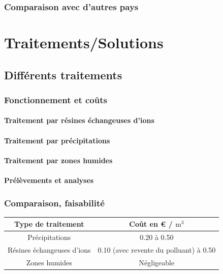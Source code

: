 \documentclass{article}
\begin{document}
\subsubsection{Comparaison avec d’autres pays }

\newpage
\section{Traitements/Solutions}
\subsection{Différents traitements}
\subsubsection{Fonctionnement et coûts}
\paragraph{Traitement par résines échangeuses d’ions} 
\paragraph{Traitement par précipitations}
\paragraph{Traitement par zones humides}
\paragraph{Prélèvements et analyses}
\subsubsection{Comparaison, faisabilité}
\begin{center}
\begin{tabular}{ |c |c |}

\hline
 Type de traitement & Coût en € / $\text{m}^3$ \\ 
 \hline
 Précipitations & 0.20 à 0.50 \\ 
 \hline
 Résines échangeuses d’ions & 0.10 (avec revente du polluant) à 0.50  \\
 \hline
Zones humides & Négligeable  \\
 \hline
\end{tabular}
\end{center}
\end{document}
